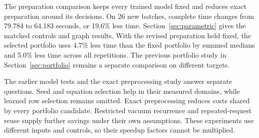 The preparation comparison keeps every trained model fixed and reduces exact preparation around its decisions. On 26 new batches, complete time changes from 79.784 to 64.183 seconds, or 19.6\% less time. Section~\ref{sec:parametric} gives the matched controls and graph results. With the revised preparation held fixed, the selected portfolio uses 4.7\% less time than the fixed portfolio by summed medians and 5.0\% less time across all repetitions. The previous portfolio study in Section~\ref{sec:portfolio} remains a separate comparison on different targets.

The earlier model tests and the exact preprocessing study answer separate questions. Seed and equation selection help in their measured domains, while learned row selection remains omitted. Exact preprocessing reduces costs shared by every portfolio candidate. Restricted vacuum recurrence and repeated-request reuse supply further savings under their own assumptions. These experiments use different inputs and controls, so their speedup factors cannot be multiplied.


